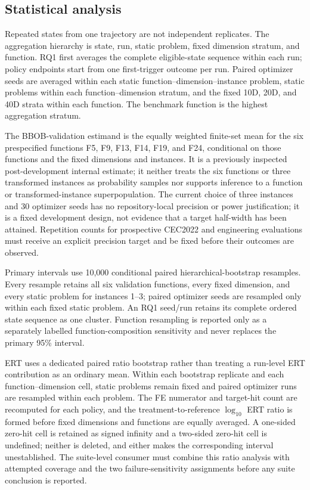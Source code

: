 \subsection{Statistical analysis}

Repeated states from one trajectory are not independent replicates.  The
aggregation hierarchy is state, run, static problem, fixed dimension stratum,
and function.  RQ1 first averages the complete eligible-state sequence within
each run; policy endpoints start from one first-trigger outcome per run.
Paired optimizer seeds are averaged within each static
function--dimension--instance problem, static problems within each
function--dimension stratum, and the fixed 10D, 20D, and 40D strata within each
function.  The benchmark function is the highest aggregation stratum.

The BBOB-validation estimand is the equally weighted finite-set mean for
the six prespecified functions F5, F9, F13, F14, F19, and F24, conditional on
those functions and the fixed dimensions and instances.  It is a previously
inspected post-development internal estimate; it neither treats the six
functions or three transformed instances as probability samples nor supports
inference to a function or transformed-instance superpopulation.  The current
choice of three instances and 30 optimizer seeds has no repository-local
precision or power justification; it is a fixed development design, not
evidence that a target half-width has been attained.  Repetition counts for
prospective CEC2022 and engineering evaluations must receive an explicit
precision target and be fixed before their outcomes are observed.

Primary intervals use 10,000 conditional paired hierarchical-bootstrap
resamples.  Every resample retains all six validation functions, every fixed
dimension, and every static problem for instances 1--3; paired optimizer seeds
are resampled only within each fixed static problem.  An RQ1 seed/run retains
its complete ordered state sequence as one cluster.  Function
resampling is reported only as a separately labelled function-composition
sensitivity and never replaces the primary 95\% interval.

ERT uses a dedicated paired ratio bootstrap rather than treating a run-level
ERT contribution as an ordinary mean.  Within each bootstrap replicate and
each function--dimension cell, static problems remain fixed and paired
optimizer runs are resampled within each problem.  The FE numerator and
target-hit count are recomputed for each policy,
and the treatment-to-reference $\log_{10}$ ERT ratio is formed before fixed
dimensions and functions are equally averaged.  A one-sided zero-hit cell is
retained as signed infinity and a two-sided zero-hit cell is undefined; neither
is deleted, and either makes the corresponding interval unestablished.  The
suite-level consumer must combine this ratio analysis with attempted coverage
and the two failure-sensitivity assignments before any suite conclusion is
reported.

